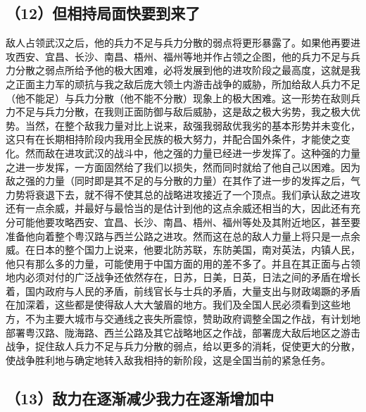 \subsection{（12）但相持局面快要到来了}

敌人占领武汉之后，他的兵力不足与兵力分散的弱点将更形暴露了。如果他再要进攻西安、宜昌、长沙、南昌、梧州、福州等地并作占领之企图，他的兵力不足与兵力分散之弱点所给予他的极大困难，必将发展到他的进攻阶段之最高度，这就是我之正面主力军的顽抗与我之敌后庞大领土内游击战争的威胁，所加给敌人兵力不足（他不能足）与兵力分散（他不能不分散）现象上的极大困难。这一形势在敌则兵力不足与兵力分散，在我则正面防御与敌后威胁，这是敌之极大劣势，我之极大优势。当然，在整个敌我力量对比上说来，敌强我弱敌优我劣的基本形势并未变化，这只有在长期相持阶段内我用全民族的极大努力，并配合国外条件，才能使之变化。然而敌在进攻武汉的战斗中，他之强的力量已经进一步发挥了。这种强的力量之进一步发挥，一方面固然给了我们以损失，然而同时就给了他自己以困难。因为敌之强的力量（同时即是其不足的与分散的力量）在其作了进一步的发挥之后，气力势将衰退下去，就不得不使其总的战略进攻接近了一个顶点。我们承认敌之进攻还有一点余威，并最好与最恰当的是估计到他的这点余威还相当的大，因此还有充分可能他要攻略西安、宜昌、长沙、南昌、梧州、福州等处及其附近地区，甚至要准备他向着整个粤汉路与西兰公路之进攻。然而这在总的敌人力量上将只是一点余威。在日本的整个国力上说来，他要北防苏联，东防美国，南对英法，内镇人民，他只有那么多的力量，可能使用于中国方面的用的差不多了。并且在其正面与占领地内必须对付的广泛战争还依然存在，日苏，日美，日英，日法之间的矛盾在增长着，国内政府与人民的矛盾，前线官长与士兵的矛盾，大量支出与财政竭蹶的矛盾在加深着，这些都是使得敌人大大皱眉的地方。我们及全国人民必须看到这些地方，不为主要大城市与交通线之丧失所震惊，赞助政府调整全国之作战，有计划地部署粤汉路、陇海路、西兰公路及其它战略地区之作战，部署庞大敌后地区之游击战争，捉住敌人兵力不足与兵力分散的弱点，给以更多的消耗，促使更大的分散，使战争胜利地与确定地转入敌我相持的新阶段，这是全国当前的紧急任务。

\subsection{（13）敌力在逐渐减少我力在逐渐增加中}

